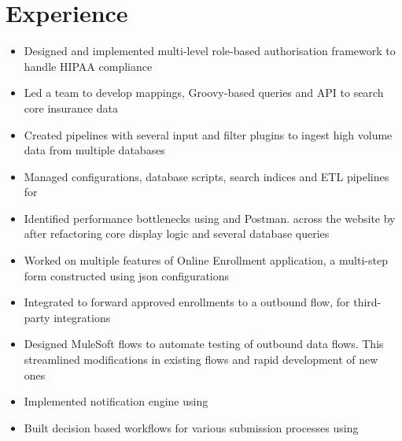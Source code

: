 \documentclass[]{resume}
\begin{document}
\begin{minipage}[t]{0.66\textwidth} 


\section{Experience}

\begin{itemize}
    \item Designed and implemented multi-level role-based authorisation framework to handle HIPAA compliance
    \item Led a team to develop  mappings, Groovy-based queries and  API to search core insurance data
    \item Created  pipelines with several input and filter plugins to ingest high volume data from multiple databases
    \item Managed configurations, database scripts, search indices and ETL pipelines for  
    \item Identified performance bottlenecks using  and Postman.  across the website by  after refactoring core display logic and several database queries
    \item Worked on multiple features of Online Enrollment application, a multi-step form constructed using json configurations 
    \item Integrated  to forward approved enrollments to a  outbound flow, for third-party integrations
    \item Designed MuleSoft flows to automate testing of outbound data flows. This streamlined modifications in existing flows and rapid development of new ones
\end{itemize}
\sectionsep



\begin{itemize}
    \item Implemented notification engine using 
    \item Built decision based workflows for various submission processes using 
\end{itemize}


\end{minipage}
\end{document}
